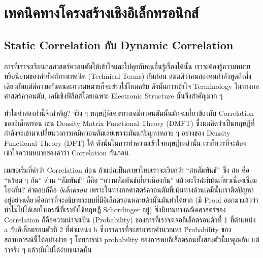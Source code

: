 

\chapter{เทคนิคทางโครงสร้างเชิงอิเล็กทรอนิกส์}
\label{ap:elec_struct_technique}

\section{Static Correlation กับ Dynamic Correlation}

การที่เราจะเรียนกลศาสตร์ควอนตัมให้เข้าใจและไปคุยกับคนอื่นรู้เรื่องได้นั้น เราจะต้องรู้ความหมายหรือนิยามของคำศัพท์ทางเทคนิค (Technical Terms)
กันก่อน สมมติว่าคนสองคนกำลังพูดถึงสิ่งเดียวกันแต่ตีความกันคนละความหมายก็จบข่าวใช่ไหมครับ ดังนั้นการเข้าใจ Terminology ในทางกลศาสตร์ควอนตัม,
เคมีเชิงฟิสิกส์โดยเฉพาะ Electronic Structure นั้นจึงสำคัญมาก ๆ

ทำไมคำสองคำนี้จึงสำคัญ? จริง ๆ ทฤษฎีพิเศษทางเคมีควอนตัมนั้นมักจะเกี่ยวข้องกับ Correlation ของอิเล็กตรอน เช่น Density Matrix Functional
Theory (DMFT) ซึ่งผมคิดว่าเป็นทฤษฎีที่กำลังจะเข้ามาเปลี่ยนวงการเคมีควอนตัมเลยเพราะมันแก้ปัญหาหลาย ๆ อย่างของ Density Functional Theory
(DFT) ได้ ดังนั้นในการทำความเข้าใจทฤษฎีเหล่านั้น เราก็ควรที่จะต้องเข้าใจความหมายของคำว่า Correlation กันก่อน

ผมขอเริ่มที่คำว่า Correlation ก่อน ถ้าแปลเป็นภาษาไทยเราจะเรียกว่า \enquote{สหสัมพันธ์} ซึ่ง สห คือ \enquote{พร้อม ๆ กัน} ส่วน
\enquote{สัมพันธ์} ก็คือ \enquote{ความสัมพันธ์เกี่ยวเนื่องกัน} แล้วอะไรล่ะที่มันเกี่ยวเนื่องเชื่อมโยงกัน? คำตอบก็คือ \textit{อิเล็กตรอน}
เพราะในทางกลศาสตร์ควอนตัมที่เน้นทางด้านเคมีนั้นเราติดปัญหาอยู่อย่างเดียวคือการที่จะอธิบายระบบที่มีอิเล็กตรอนหลายตัวนั้นมันทำได้ยาก (มี Proof
ออกมาแล้วว่าทำไมไม่ได้เลยในกรณีที่เรายังใช้ทฤษฎี Schordinger อยู่) ซึ่งนิยามทางคณิคศาสตร์ของ Correlation ก็คือความน่าจะเป็น (Probability)
ของการที่เราจะเจออิเล็กตรอนตัวที่ 1 ที่ตำแหน่ง a กับอิเล็กตรอนตัวที่ 2 ที่ตำแหน่ง b ซึ่งเราควรที่จะสามารถคำนวณหา Probability
ของสถานการณ์นี้ได้อย่างง่าย ๆ โดยการนำ probability ของการพบอิเล็กตรอนทั้งสองตัวนี้มาคูณกัน แต่ว่าจริง ๆ แล้วมันไม่ได้ง่ายขนาดนั้น

